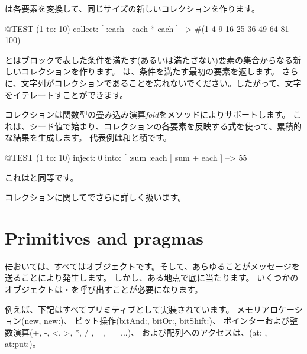 \documentclass[a4paper,10pt,twoside]{book}
\begin{document}

は各要素を変換して、同じサイズの新しいコレクションを作ります。
\begin{code}{@TEST}
(1 to: 10) collect: [ :each | each * each ] --> #(1 4 9 16 25 36 49 64 81 100)
\end{code}

とはブロックで表した条件を満たす(あるいは満たさない)要素の集合からなる新しいコレクションを作ります。
は、条件を満たす最初の要素を返します。
さらに、文字列がコレクションであることを忘れないでください。したがって、文字をイテレートすことができます。


コレクションは関数型の畳み込み演算\emph{fold}をメソッドによりサポートします。
これは、シード値で始まり、コレクションの各要素を反映する式を使って、累積的な結果を生成します。
代表例は和と積です。

\begin{code}{@TEST}
(1 to: 10) inject: 0 into: [ :sum :each | sum + each ] --> 55
\end{code}

\noindent
これはと同等です。

コレクションに関してでさらに詳しく扱います。

\section{Primitives and pragmas}

\st においては、すべてはオブジェクトです。そして、あらゆることがメッセージを送ることにより発生します。
しかし、ある地点で底に当たります。
いくつかのオブジェクトは・を呼び出すことが必要になります。

例えば、下記はすべてプリミティブとして実装されています。
メモリアロケーション(new, new:)、
ビット操作(bitAnd:, bitOr:, bitShift:)、
ポインターおよび整数演算(+, -, <, >, *, / , =, ==...)、
および配列へのアクセスは、(at: , at:put:)。
\end{document}

